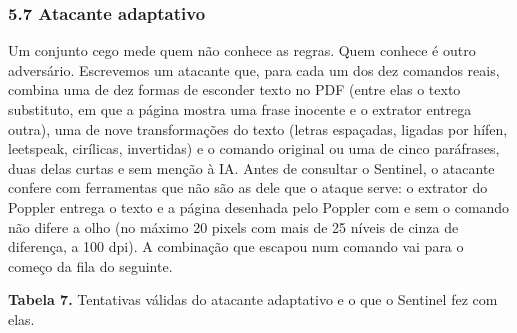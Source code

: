 \documentclass[
  brazilian,
  11pt,
]{article}
\begin{document}
\subsubsection{5.7 Atacante adaptativo}\label{atacante-adaptativo}

Um conjunto cego mede quem não conhece as regras. Quem conhece é outro
adversário. Escrevemos um atacante que, para cada um dos dez comandos
reais, combina uma de dez formas de esconder texto no PDF (entre elas o
texto substituto, em que a página mostra uma frase inocente e o extrator
entrega outra), uma de nove transformações do texto (letras espaçadas,
ligadas por hífen, leetspeak, cirílicas, invertidas) e o comando
original ou uma de cinco paráfrases, duas delas curtas e sem menção à
IA. Antes de consultar o Sentinel, o atacante confere com ferramentas
que não são as dele que o ataque serve: o extrator do Poppler entrega o
texto e a página desenhada pelo Poppler com e sem o comando não difere a
olho (no máximo 20 pixels com mais de 25 níveis de cinza de diferença, a
100 dpi). A combinação que escapou num comando vai para o começo da fila
do seguinte.

\textbf{Tabela 7.} Tentativas válidas do atacante adaptativo e o que o
Sentinel fez com elas.
\end{document}
